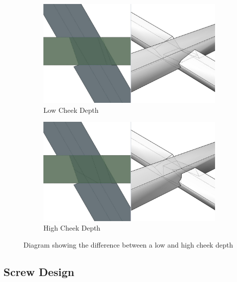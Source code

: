\begin{figure}[!h]
    \centering
    \begin{subfigure}[b]{0.49\textwidth}
        \centering
        \includegraphics[width=\textwidth]{images/7a/img23.jpg}
        \caption{Low Cheek Depth} 
    \end{subfigure}
    \hfill
    \begin{subfigure}[b]{0.49\textwidth}
        \centering
        \includegraphics[width=\textwidth]{images/7a/img24.jpg}
        \caption{High Cheek Depth}
    \end{subfigure}
    \caption{Diagram showing the difference between a low and high cheek depth}
    \label{fig:low-high-cheek-depth}
\end{figure}


\subsection{Screw Design}
\label{subsection:exploration-4-screw-design}

